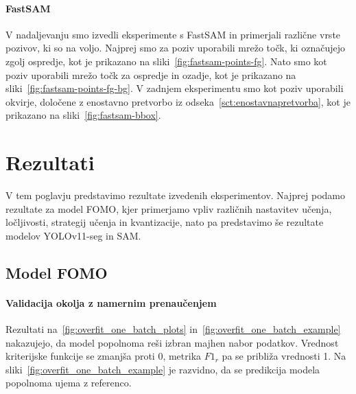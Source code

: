 \documentclass[a4paper,twoside,openright,12pt,slovene]{book}
\begin{document}
            \paragraph{FastSAM} \label{sct:fastsam}

            V nadaljevanju smo izvedli eksperimente s FastSAM in primerjali
            različne vrste pozivov, ki so na voljo. Najprej smo za poziv uporabili
            mrežo točk, ki označujejo zgolj ospredje, kot je prikazano na
            sliki~\ref{fig:fastsam-points-fg}.
            Nato smo kot poziv uporabili mrežo točk za ospredje in ozadje, kot je
            prikazano na
            sliki~\ref{fig:fastsam-points-fg-bg}.
            V zadnjem eksperimentu smo kot poziv uporabili okvirje, določene z
            enostavno pretvorbo iz
            odseka~\ref{sct:enostavnapretvorba},
            kot je prikazano na sliki~\ref{fig:fastsam-bbox}.

    \FloatBarrier

    \section{Rezultati} \label{sct:rezultati}

        V tem poglavju predstavimo rezultate izvedenih
        eksperimentov. Najprej podamo rezultate za model FOMO, kjer primerjamo
        vpliv različnih nastavitev učenja, ločljivosti, strategij učenja in
        kvantizacije, nato pa predstavimo še rezultate modelov YOLOv11-seg in
        SAM.

        \subsection{Model FOMO}
        
            \paragraph{Validacija okolja z namernim prenaučenjem}

            Rezultati na~\ref{fig:overfit_one_batch_plots}
            in~\ref{fig:overfit_one_batch_example}
            nakazujejo,
            da model popolnoma reši izbran majhen nabor podatkov.
            Vrednost kriterijske funkcije se zmanjša proti 0,
            metrika $F1_r$ pa se približa vrednosti 1. Na
            sliki~\ref{fig:overfit_one_batch_example}
            je razvidno, da se predikcija modela popolnoma ujema z referenco.
\end{document}
